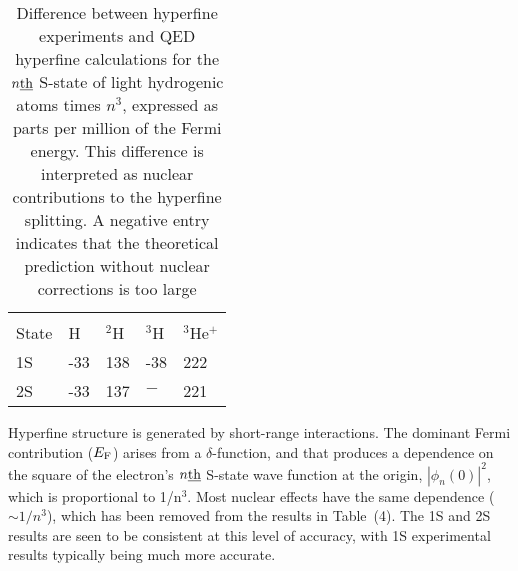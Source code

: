 \documentclass{svmult}
\begin{document}
\begin{table}[htb]
\centering
\caption{Difference between hyperfine experiments and QED hyperfine calculations
for the $n\underline{\rm th}$ S-state of light hydrogenic atoms times $n^3$,
expressed as parts per million of the Fermi energy. This difference is
interpreted as nuclear contributions to the hyperfine
splitting\protect\cite{sav-nu}. A negative entry indicates that the theoretical
prediction without nuclear corrections is too large}
\begin{tabular}{l l l l l}
\hline \noalign{\smallskip}
\multicolumn{5}{c}{$n^3 (E_{\rm hfs}^{\rm exp} - 
E_{\rm hfs}^{\rm QED})/E_{\rm F}\, {\rm (ppm)}$} \\ \noalign{\smallskip} \hline
 State \hspace{0.3in} & H \hspace{0.3in}    & $^2$H \hspace{0.3in} 
 & $^3$H \hspace{0.3in}    & $^3$He$^+$ \rule{0in}{2.5ex}\\ \hline \hline
 1S    & -33   & 138    & -38       & 222        \\ \hline
 2S    & -33   & 137    &\mbox{$-$} & 221        \\ \hline 
\end{tabular}
\end{table}

Hyperfine structure is generated by short-range interactions. The dominant Fermi
contribution ($E_{\rm F}$) arises from a $\delta$-function, and that produces a
dependence on the square of the electron's $n\underline{\rm th}$ S-state wave
function at the origin, $|\phi_n (0)|^2$, which is proportional to 1/n$^3$. Most
nuclear effects have the same dependence ($\sim 1/n^3$), which has been removed
from the results in Table~(4). The 1S and 2S results are seen to be consistent
at this level of accuracy, with 1S experimental results typically being much
more accurate.
\end{document}

